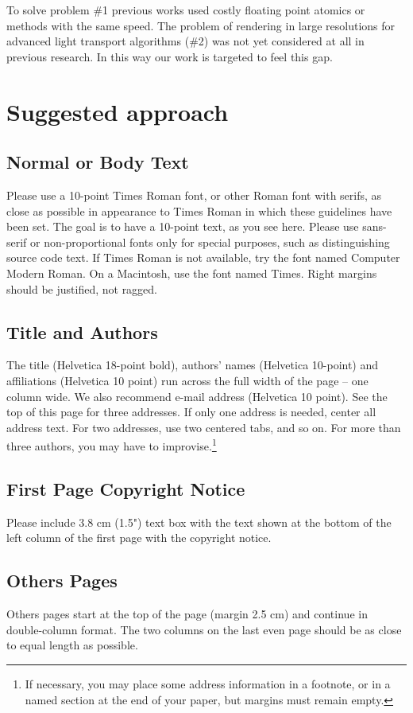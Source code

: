 \documentclass[twoside,twocolumn,10pt]{article}
\begin{document}
To solve problem \#1 previous works used costly floating point atomics or methods with the same speed. The problem of rendering in large resolutions for advanced light transport algorithms (\#2) was not yet considered at all in previous research. In this way our work is targeted to feel this gap.

\section{Suggested approach}
\subsection*{Normal or Body Text}
Please use a 10-point Times Roman font, or other Roman font with serifs, as close as possible in appearance to Times Roman in which these guidelines have been set. The goal is to have a 10-point text, as you see here. Please use sans-serif or non-proportional fonts only for special purposes, such as distinguishing source code text. If Times Roman is not available, try the font named Computer Modern Roman. On a Macintosh, use the font named Times.  Right margins should be justified, not ragged.

\subsection*{Title and Authors}
The title (Helvetica 18-point bold), authors' names (Helvetica 10-point) and affiliations (Helvetica 10 point) run across the full width of the page -- one column wide. We also recommend e-mail address (Helvetica 10 point). See the top of this page for three addresses. If only one address is needed, center all address text. For two addresses, use two centered tabs, and so on. For more than three authors, you may have to improvise.\footnote{If necessary, you may place some address information in a footnote, or in a named section at the end of your paper, but margins must remain empty.} 

\subsection*{First Page Copyright Notice}
Please include 3.8 cm (1.5") text box with the text shown at the bottom of the left column of the first page with the copyright notice.

\subsection*{Others Pages}
Others pages start at the top of the page (margin 2.5 cm) and continue in double-column format.  The two columns on the last even page should be as close to equal length as possible. 
\end{document}
